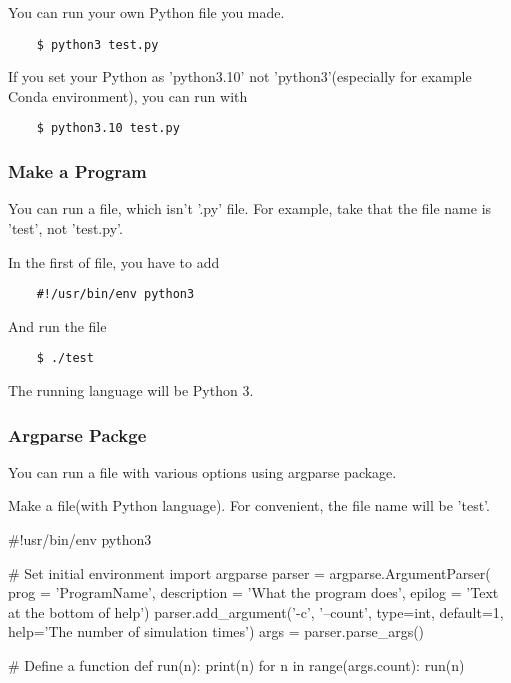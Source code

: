 You can run your own Python file you made.

\begin{verbatim}
    $ python3 test.py
\end{verbatim}

If you set your Python as 'python3.10' not 'python3'(especially for example Conda environment), you can run with

\begin{verbatim}
    $ python3.10 test.py
\end{verbatim}

\subsubsection{Make a Program}

You can run a file, which isn't '.py' file. For example, take that the file name is 'test', not 'test.py'.

In the first of file, you have to add

\begin{verbatim}
    #!/usr/bin/env python3
\end{verbatim}

And run the file

\begin{verbatim}
    $ ./test
\end{verbatim}

The running language will be Python 3.

\subsubsection{Argparse Packge}

You can run a file with various options using argparse package.

Make a file(with Python language). For convenient, the file name will be 'test'.

\begin{python}[python3]
    #!usr/bin/env python3
    
    # Set initial environment
    import argparse
    parser = argparse.ArgumentParser(
        prog = 'ProgramName',
        description = 'What the program does',
        epilog = 'Text at the bottom of help')
    parser.add_argument('-c',
                        '--count',
                        type=int,
                        default=1,
                        help='The number of simulation times')
    args = parser.parse_args()

    # Define a function
    def run(n):
        print(n)
    for n in range(args.count):
        run(n)
\end{python}

